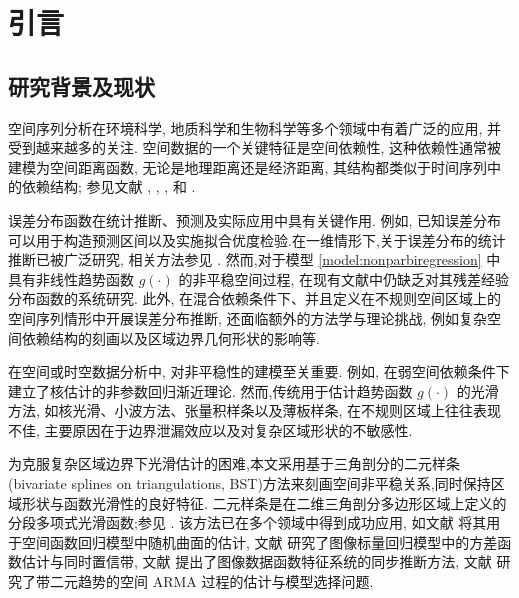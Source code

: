 \documentclass[a4paper,openay,14pt]{ctexbook}
\numberwithin{equation}{section}
\numberwithin{lem}{section}
\newcommand{\chapterwithfancyheader}[1]{  
    \chapter{#1} %
    \thispagestyle{fancy} %
}
\begin{document}


\newpage



\clearpage %
\tableofcontents
\thispagestyle{empty}
\listoftables
\let\cleardoublepage\clearpage
\listoffigures

\mainmatter
\pagestyle{fancy}\fancyhf{}
\fancyhead[EL]{\leftmark}
\fancyhead[OR]{\leftmark}
\fancyfoot[C]{\thepage }

\chapterwithfancyheader{引言}
\section{研究背景及现状}

空间序列分析在环境科学, 地质科学和生物科学等多个领域中有着广泛的应用, 并受到越来越多的关注. 
空间数据的一个关键特征是空间依赖性, 这种依赖性通常被建模为空间距离函数, 
无论是地理距离还是经济距离, 其结构都类似于时间序列中的依赖结构; 
参见文献 \cite{whittle1954stationary}, \cite{anselin1980estimation}, 
\cite{yao2006gaussian}, \cite{robinson2011asymptotic} 和 \cite{cressie2015statistics}.

误差分布函数在统计推断、预测及实际应用中具有关键作用. 例如, 已知误差分布可以用于构造预测区间以及实施拟合优度检验.在一维情形下,关于误差分布的统计推断已被广泛研究, 相关方法参见
\cite{akritas2001non, cheng2002consistency, cheng2005asymptotic, muller2007estimating, chan2008residual, kiwitt2012estimating, gu2021smooth, zhong2025inference}.
然而,对于模型 \eqref{model:nonparbiregression} 中具有非线性趋势函数 \( g(\cdot) \) 的非平稳空间过程, 在现有文献中仍缺乏对其残差经验分布函数的系统研究. 此外, 在混合依赖条件下、并且定义在不规则空间区域上的空间序列情形中开展误差分布推断, 还面临额外的方法学与理论挑战, 例如复杂空间依赖结构的刻画以及区域边界几何形状的影响等.

在空间或时空数据分析中, 对非平稳性的建模至关重要. 例如,\cite{robinson2011asymptotic} 在弱空间依赖条件下建立了核估计的非参数回归渐近理论. 然而,传统用于估计趋势函数 \( g(\cdot) \) 的光滑方法, 如核光滑、小波方法、张量积样条以及薄板样条, 在不规则区域上往往表现不佳, 主要原因在于边界泄漏效应以及对复杂区域形状的不敏感性.

为克服复杂区域边界下光滑估计的困难,本文采用基于三角剖分的二元样条(bivariate splines on triangulations, BST)方法来刻画空间非平稳关系,同时保持区域形状与函数光滑性的良好特征. 二元样条是在二维三角剖分多边形区域上定义的分段多项式光滑函数;参见 \cite{lai2013bivariate}. 该方法已在多个领域中得到成功应用, 如文献\cite{guillas2010bivariate} 将其用于空间函数回归模型中随机曲面的估计, 文献\cite{yu2021multivariate} 研究了图像标量回归模型中的方差函数估计与同时置信带, 文献\cite{hu2024statistical} 提出了图像数据函数特征系统的同步推断方法, 文献\cite{zhang2025oracally} 研究了带二元趋势的空间 ARMA 过程的估计与模型选择问题.
\end{document}
